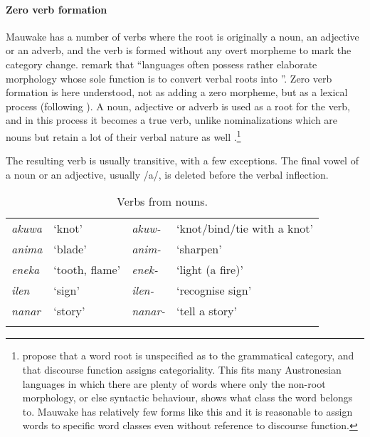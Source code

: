 \paragraph{Zero verb formation}\label{sec:3.8.2.2.1}
{}
Mauwake has a number of verbs where the root is originally a noun, an adjective or an adverb, and the verb is formed without any overt morpheme to mark the category change. \citet[745]{HopperEtAl1984} remark that ``{languages often possess rather elaborate morphology whose sole function is to convert verbal roots into}  ''. Zero verb formation is here understood, not as adding a zero morpheme, but as a lexical process (following \citealt[224]{Payne1997}). A noun, adjective or adverb is used as a root for the verb, and in this process it becomes a true verb, unlike nominalizations which are nouns but retain a lot of their verbal nature as well \citep[747]{HopperEtAl1984}%
.\footnote{\citet{HopperEtAl1984} propose that a word root is unspecified as to the grammatical category, and that discourse function assigns categoriality. This fits many Austronesian languages in which there are plenty of words where only the non-root morphology, or else syntactic behaviour, shows what class the word belongs to. Mauwake has relatively few forms like this and it is reasonable to assign words to specific word classes even without reference to discourse function.}

The resulting verb is usually transitive, with a few exceptions. The final vowel of a noun or an adjective, usually /a/, is deleted before the verbal inflection. 

\begin{table}
\caption{Verbs from nouns.}
 
\begin{tabular}{>{\itshape}ll>{\itshape}ll}
\mytoprule
akuwa &`knot' &akuw- &`knot/bind/tie with a knot'\\
anima &`blade' &anim- &`sharpen'\\
eneka &`tooth, flame' &enek- &`light (a fire)'\\
ilen &`sign' &ilen- &`recognise sign'\\
nanar &`story' &nanar- &`tell a story'\\
\mybottomrule
\end{tabular}

\end{table}

